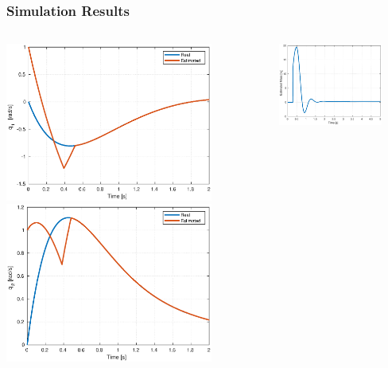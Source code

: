 \documentclass[9pt,spanish,aspectratio=1610]{beamer}
\begin{document}
\begin{frame}\frametitle{Simulation Results}
  \begin{columns}
    \begin{column}{0.5\textwidth}
      \includegraphics[width=0.8\textwidth]{Figures/est_q1.eps}
      \includegraphics[width=0.8\textwidth]{Figures/est_q2.eps}
    \end{column}
    \begin{column}{0.5\textwidth}
      \includegraphics[width=0.8\textwidth]{Figures/estimated_mass.eps}

\end{column}
\end{columns}
\end{frame}
\end{document}
